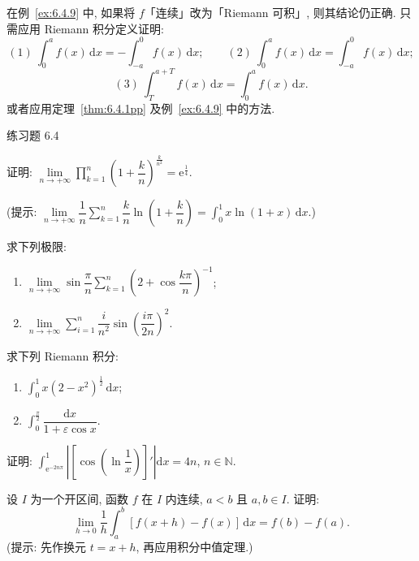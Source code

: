 \begin{remark}\label{rem:6.4.1}
在例~\ref{ex:6.4.9} 中, 如果将 $f$「连续」改为「Riemann 可积」, 则其结论仍正确. 只需应用 Riemann 积分定义证明:
\[
(1)\ \int_{0}^{a}f(x)\,\mathrm{d}x=-\int_{-a}^{0}f(x)\,\mathrm{d}x;\qquad(2)\ \int_{0}^{a}f(x)\,\mathrm{d}x=\int_{-a}^{0}f(x)\,\mathrm{d}x;
\]
\[
(3)\ \int_{T}^{a+T}f(x)\,\mathrm{d}x=\int_{0}^{a}f(x)\,\mathrm{d}x.
\]
或者应用定理~\ref{thm:6.4.1pp} 及例~\ref{ex:6.4.9} 中的方法.
\end{remark}

\begin{exblock}{练习题 6.4}

  \item 证明: $\lim\limits_{n\to+\infty}\prod\limits_{k=1}^{n}\left(1+\dfrac{k}{n}\right)^{\frac{k}{n^{2}}}=\mathrm{e}^{\frac{1}{4}}$.

  (提示: $\lim\limits_{n\to+\infty}\dfrac{1}{n}\sum\limits_{k=1}^{n}\dfrac{k}{n}\ln\left(1+\dfrac{k}{n}\right)=\int_{0}^{1}x\ln(1+x)\,\mathrm{d}x$.)

  \item 求下列极限:
  \begin{enumerate}[label=(\arabic*)]
    \item $\lim\limits_{n\to+\infty}\sin\dfrac{\pi}{n}\sum\limits_{k=1}^{n}\left(2+\cos\dfrac{k\pi}{n}\right)^{-1}$;
    \item $\lim\limits_{n\to+\infty}\sum\limits_{i=1}^{n}\dfrac{i}{n^{2}}\sin\left(\dfrac{i\pi}{2n}\right)^{2}$.
  \end{enumerate}

  \item 求下列 Riemann 积分:
  \begin{enumerate}[label=(\arabic*)]
    \item $\int_{0}^{1}x(2-x^{2})^{\frac{1}{2}}\,\mathrm{d}x$;
    \item $\int_{0}^{\frac{\pi}{2}}\dfrac{\mathrm{d}x}{1+\varepsilon\cos x}$.
  \end{enumerate}

  \item 证明: $\int_{\mathrm{e}^{-2n\pi}}^{1}\left|\left[\cos\left(\ln\dfrac{1}{x}\right)\right]'\right|\mathrm{d}x=4n$, $n\in\mathbb{N}$.

  \item 设 $I$ 为一个开区间, 函数 $f$ 在 $I$ 内连续, $a<b$ 且 $a,b\in I$. 证明:
  \[
  \lim_{h\to0}\frac{1}{h}\int_{a}^{b}[f(x+h)-f(x)]\,\mathrm{d}x=f(b)-f(a).
\]
  (提示: 先作换元 $t=x+h$, 再应用积分中值定理.)


\end{exblock}
